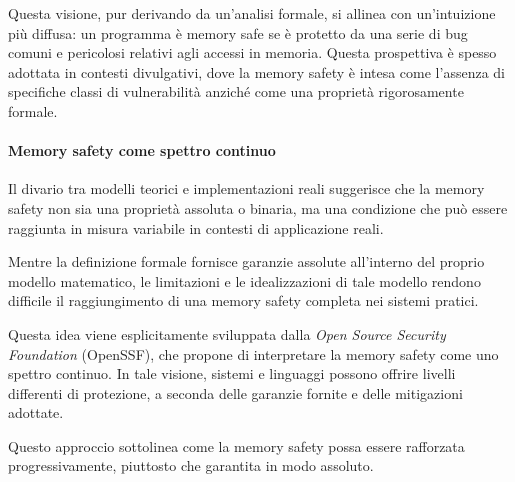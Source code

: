 Questa visione, pur derivando da un'analisi formale, si allinea con un'intuizione
più diffusa: un programma è memory safe se è protetto da una serie di bug comuni
e pericolosi relativi agli accessi in memoria. Questa prospettiva è spesso
adottata in contesti divulgativi, dove la memory safety è intesa come l'assenza di
specifiche classi di vulnerabilità anziché come una proprietà rigorosamente formale.

\paragraph{Memory safety come spettro continuo}

Il divario tra modelli teorici e implementazioni reali suggerisce che la memory safety
non sia una proprietà assoluta o binaria, ma una condizione che può essere
raggiunta in misura variabile in contesti di applicazione reali.

Mentre la definizione formale fornisce garanzie assolute all'interno del proprio
modello matematico, le limitazioni e le idealizzazioni di tale modello rendono difficile
il raggiungimento di una memory safety completa nei sistemi pratici.

Questa idea viene esplicitamente sviluppata dalla \textit{Open Source Security
Foundation} (OpenSSF)\cite{memory_safety_continuum}, che propone di interpretare
la memory safety come uno spettro continuo. In tale visione, sistemi e linguaggi
possono offrire livelli differenti di protezione, a seconda delle garanzie fornite
e delle mitigazioni adottate.

Questo approccio sottolinea come la memory safety possa essere rafforzata progressivamente,
piuttosto che garantita in modo assoluto.